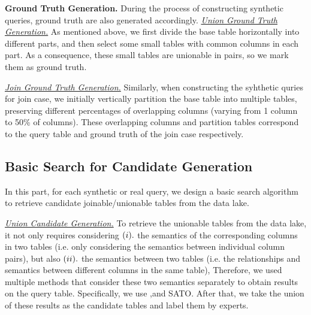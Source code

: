  
  

\noindent \textbf{Ground Truth Generation.} 
During the process of constructing synthetic queries, ground truth are also generated accordingly.
\noindent \underline{\textit{Union Ground Truth Generation.}}  
As mentioned above, we first divide the base table horizontally into different parts, and then select some small tables with common columns in each part. As a consequence, these small tables are unionable in pairs, so we mark them as ground truth.

\noindent \underline{\textit{Join Ground Truth Generation.}} 
Similarly, when constructing the syhthetic quries for join case, we initially vertically partition the base table into multiple tables, preserving different percentages of overlapping columns (varying from 1 column to 50\% of columns). These overlapping columns and partition tables correspond to the query table and ground truth of the join case respectively.


\subsection{Basic Search for Candidate Generation}
In this part, for each synthetic or real query, we design a basic search algorithm to retrieve  candidate joinable/unionable tables from the data lake. 

\noindent \underline{\textit{Union Candidate Generation.}}  
To retrieve the unionable tables from the data lake, it not only requires considering $(\romannumeral1 ).$  the semantics of the corresponding columns in two tables (i.e. only considering the semantics between individual column pairs), but also $(\romannumeral2 ).$ the semantics between two tables (i.e. the relationships and semantics between different columns in the same table),  Therefore, we used multiple methods that consider these two semantics separately to obtain results on the query table. Specifically, we use \starmie,\santos and SATO. After that, we take the union of these results as the candidate tables and label them by experts.


